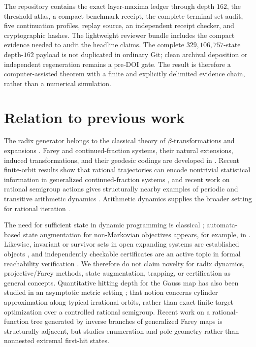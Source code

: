\documentclass[11pt]{amsart}
\theoremstyle{definition}
\begin{document}
The repository contains the exact layer-maxima ledger through depth $162$, the threshold atlas, a compact benchmark receipt, the complete terminal-set audit, five continuation profiles, replay source, an independent receipt checker, and cryptographic hashes.  The lightweight reviewer bundle includes the compact evidence needed to audit the headline claims.  The complete $329{,}106{,}757$-state depth-$162$ payload is not duplicated in ordinary Git; clean archival deposition or independent regeneration remains a pre-DOI gate.  The result is therefore a computer-assisted theorem with a finite and explicitly delimited evidence chain, rather than a numerical simulation.

\section{Relation to previous work}

The radix generator belongs to the classical theory of $\beta$-transformations and expansions \cite{Renyi1957Representations,Parry1960On,Dajani2002Ergodic}.  Farey and continued-fraction systems, their natural extensions, induced transformations, and their geodesic codings are developed in \cite{Nakada1981Metrical,Series1985The,Isola2003On,Merriman2023Geodesic,Panti2026There,Schmidt2025First,Dajani2026Inducing,Chen2026Strange}.  Recent finite-orbit results show that rational trajectories can encode nontrivial statistical information in generalized continued-fraction systems \cite{Berthe2025Multidimensional}, and recent work on rational semigroup actions gives structurally nearby examples of periodic and transitive arithmetic dynamics \cite{Javaheri2026Transitive}.  Arithmetic dynamics supplies the broader setting for rational iteration \cite{Silverman2007The,Anashin2009Applied}.

The need for sufficient state in dynamic programming is classical \cite{Bellman1952On,Light2023The}; automata-based state augmentation for non-Markovian objectives appears, for example, in \cite{Brafman2017Specifying}.  Likewise, invariant or survivor sets in open expanding systems are established objects \cite{Kong2025Open}, and independently checkable certificates are an active topic in formal reachability verification \cite{Chatterjee2025Fixed}.  We therefore do not claim novelty for radix dynamics, projective/Farey methods, state augmentation, trapping, or certification as general concepts.  Quantitative hitting depth for the Gauss map has also been studied in an asymptotic metric setting \cite{Peng2014Hitting}; that notion concerns cylinder approximation along typical irrational orbits, rather than exact finite target optimization over a controlled rational semigroup.  Recent work on a rational-function tree generated by inverse branches of generalized Farey maps \cite{LangeveldRalston2026Tree} is structurally adjacent, but studies enumeration and pole geometry rather than nonnested extremal first-hit states.
\end{document}
